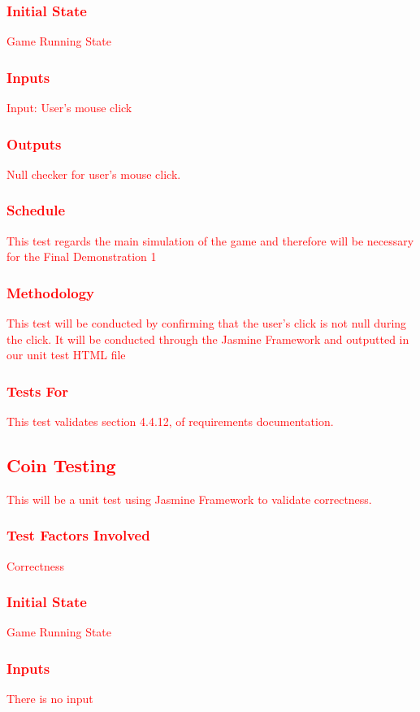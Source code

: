 \documentclass[11pt, oneside]{article}   	%
\begin{document}
\subsubsection{\textcolor{red}{Initial State}}
\textcolor{red}{Game Running State}
\subsubsection{\textcolor{red}{Inputs}}
\textcolor{red}{Input: User's mouse click}
\subsubsection{\textcolor{red}{Outputs}}
\textcolor{red}{Null checker for user's mouse click.}
\subsubsection{\textcolor{red}{Schedule}}
\textcolor{red}{This test regards the main simulation of the game and therefore will be necessary for the Final Demonstration 1}
\subsubsection{\textcolor{red}{Methodology}}
\textcolor{red}{This test will be conducted by confirming that the user's click is not null during the click. It will be conducted through the Jasmine Framework and outputted in our unit test HTML file}
\subsubsection{\textcolor{red}{Tests For}}
\textcolor{red}{This test validates section 4.4.12, of requirements documentation.}


\subsection{\textcolor{red}{Coin Testing}}
\textcolor{red}{This will be a unit test using Jasmine Framework to validate correctness.}
\subsubsection{\textcolor{red}{Test Factors Involved}}
\textcolor{red}{Correctness}
\subsubsection{\textcolor{red}{Initial State}}
\textcolor{red}{Game Running State}
\subsubsection{\textcolor{red}{Inputs}}
\textcolor{red}{There is no input}
\end{document}
